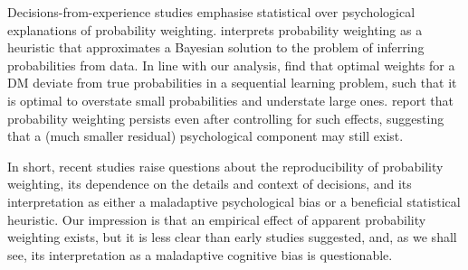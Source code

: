 \documentclass[a4paper, 12pt]{article}
\newcommand{\seclabel}[1]{\label{sec:#1}}
\newcommand{\MK}[1]{\textcolor{red}{\textit{***MK: #1 MK***}}}
\begin{document}
Decisions-from-experience studies emphasise statistical over psychological explanations of probability weighting. \textcite{Martins2006} interprets probability weighting as a heuristic that approximates a Bayesian solution to the problem of inferring probabilities from data. In line with our analysis, \textcite{SeoETAL2019} find that optimal weights for a DM deviate from true probabilities in a sequential learning problem, such that it is optimal to overstate small probabilities and understate large ones. \textcite{FoxHadar2006,UngemachETAL2009} report that probability weighting persists even after controlling for such effects, suggesting that a (much smaller residual) psychological component may still exist.

In short, recent studies raise questions about the reproducibility of probability weighting, its dependence on the details and context of decisions, and its interpretation as either a maladaptive psychological bias or a beneficial statistical heuristic. Our impression is that an empirical effect of apparent probability weighting exists, but it is less clear than early studies suggested, and, as we shall see, its interpretation as a maladaptive cognitive bias is questionable.


\end{document}
